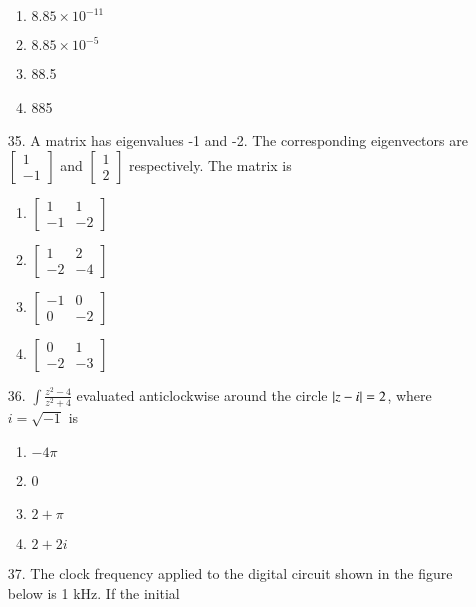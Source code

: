 \documentclass[journal]{IEEEtran}
\begin{document}
\begin{enumerate}
    \begin{enumerate}[label=(\Alph*)]
        \item  $8.85\times 10^{-11}$ 
        \item $8.85\times 10^{-5}$ 
        \item  88.5
        \item  885 
    \end{enumerate} 
    
    \item[35.] A matrix has eigenvalues -1 and -2. The corresponding eigenvectors are $\begin{bmatrix}1\\-1\end{bmatrix}$ and $\begin{bmatrix}1\\2\end{bmatrix}$ respectively. The matrix is 
    \begin{enumerate}[label=(\Alph*)]
        \item $\begin{bmatrix}1&1\\-1&-2\end{bmatrix}$
        \item $\begin{bmatrix}1&2\\-2&-4\end{bmatrix}$
        \item $\begin{bmatrix}-1&0\\0&-2\end{bmatrix}$
        \item $\begin{bmatrix}0&1\\-2&-3\end{bmatrix}$
    \end{enumerate}
    \item[36.] $\int\frac{z^2-4}{z^2+4}$  evaluated anticlockwise around the circle $\left\vert z-i\right\vert=2$, where $i=\sqrt{-1}$ is
     \begin{enumerate}[label=(\Alph*)]
        \item $-4\pi$
        \item 0
        \item $2+\pi$
        \item $2+2i$
     \end{enumerate}
    \item[37.] The clock frequency applied to the digital circuit shown in the figure below is 1 kHz. If the initial

\end{enumerate}
\end{document}

